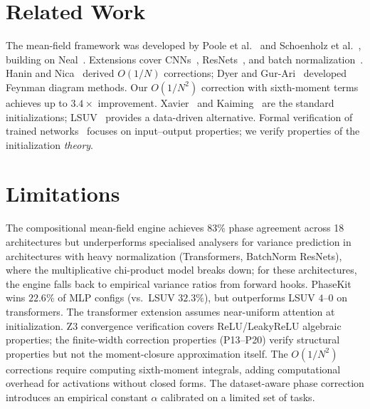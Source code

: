 \documentclass[10pt]{article}
\begin{document}
\section{Related Work}
\label{sec:related}

The mean-field framework was developed by Poole et al.~\cite{poole2016exponential} and Schoenholz et al.~\cite{schoenholz2017deep}, building on Neal~\cite{neal1996bayesian}.
Extensions cover CNNs~\cite{xiao2018dynamical}, ResNets~\cite{yang2017mean}, and batch normalization~\cite{yang2019mean}.
Hanin and Nica~\cite{hanin2018neural,hanin2020finite} derived $O(1/N)$ corrections; Dyer and Gur-Ari~\cite{dyer2020asymptotics} developed Feynman diagram methods.
Our $O(1/N^2)$ correction with sixth-moment terms achieves up to $3.4\times$ improvement.
Xavier~\cite{glorot2010understanding} and Kaiming~\cite{he2015delving} are the standard initializations; LSUV~\cite{mishkin2016all} provides a data-driven alternative.
Formal verification of trained networks~\cite{katz2017reluplex,huang2017safety,singh2019abstract} focuses on input--output properties; we verify properties of the initialization \emph{theory}.

\section{Limitations}
\label{sec:limitations}

The compositional mean-field engine achieves 83\% phase agreement across 18 architectures but underperforms specialised analysers for variance prediction in architectures with heavy normalization (Transformers, BatchNorm ResNets), where the multiplicative chi-product model breaks down; for these architectures, the engine falls back to empirical variance ratios from forward hooks.
PhaseKit wins $22.6\%$ of MLP configs (vs.\ LSUV $32.3\%$), but outperforms LSUV $4$--$0$ on transformers.
The transformer extension assumes near-uniform attention at initialization.
Z3 convergence verification covers ReLU/LeakyReLU algebraic properties; the finite-width correction properties (P13--P20) verify structural properties but not the moment-closure approximation itself.
The $O(1/N^2)$ corrections require computing sixth-moment integrals, adding computational overhead for activations without closed forms.
The dataset-aware phase correction introduces an empirical constant $\alpha$ calibrated on a limited set of tasks.
\end{document}
